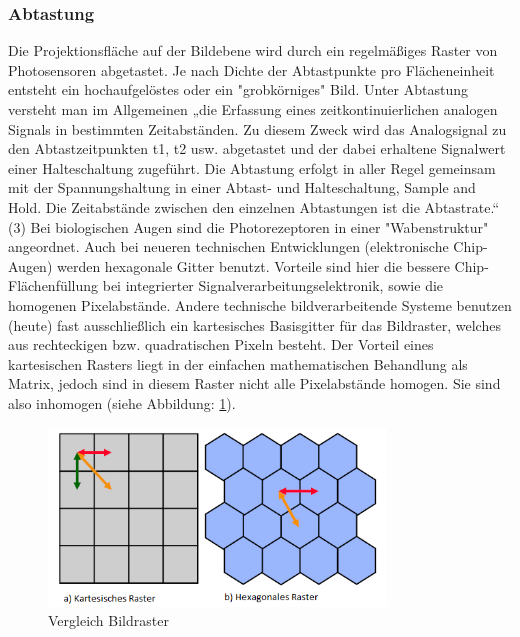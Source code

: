 \subsubsection{Abtastung}

Die Projektionsfläche auf der Bildebene wird durch ein regelmäßiges Raster von Photosensoren abgetastet. Je nach Dichte der Abtastpunkte pro Flächeneinheit entsteht ein hochaufgelöstes oder ein "grobkörniges" Bild. Unter Abtastung versteht man im Allgemeinen „die Erfassung eines zeitkontinuierlichen analogen Signals in bestimmten Zeitabständen. Zu diesem Zweck wird das Analogsignal zu den Abtastzeitpunkten t1, t2 usw. abgetastet und der dabei erhaltene Signalwert einer Halteschaltung zugeführt. Die Abtastung erfolgt in aller Regel gemeinsam mit der Spannungshaltung in einer Abtast- und Halteschaltung, Sample and Hold. Die Zeitabstände zwischen den einzelnen Abtastungen ist die Abtastrate.“ (3)
Bei biologischen Augen sind die Photorezeptoren in einer "Wabenstruktur" angeordnet. 
Auch bei neueren technischen Entwicklungen (elektronische Chip- Augen) werden hexagonale Gitter benutzt. Vorteile sind hier die bessere Chip-Flächenfüllung bei integrierter Signalverarbeitungselektronik, sowie die homogenen Pixelabstände. Andere technische bildverarbeitende Systeme benutzen (heute) fast ausschließlich ein kartesisches Basisgitter für das Bildraster, welches aus rechteckigen bzw. quadratischen Pixeln besteht. Der Vorteil eines kartesischen Rasters liegt in der einfachen mathematischen Behandlung als Matrix, jedoch sind in diesem Raster nicht alle Pixelabstände homogen. Sie sind also inhomogen (siehe Abbildung: \ref{fig:bildraster_steph}).

\begin{figure}
	\centering
		\includegraphics[width=0.8\textwidth]{img/vergleich_bildraster_Steph.png}
	\caption[Vergleich Bildraster]{Vergleich Bildraster}
	\label{fig:bildraster_steph}
\end{figure}

